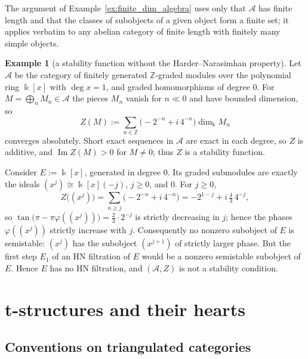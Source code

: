 \documentclass[12pt]{amsart}
\newenvironment{remark}{{\textbf{Remark.}}}
\numberwithin{theorem}{section}
\theoremstyle{definition}
\newtheorem{example}[theorem]{Example}
\newcommand{\ZZ}{\mathbb{Z}}
\newcommand{\calA}{\mathcal{A}}
\newcommand{\kk}{\Bbbk}
\newcommand{\im}{\operatorname{Im}}
\begin{document}
	\begin{remark}
		The argument of Example~\ref{ex:finite_dim_algebra} uses only that $\calA$ has finite length and that the classes of subobjects of a given object form a finite set; it applies verbatim to any abelian category of finite length with finitely many simple objects.
	\end{remark}
	
	\begin{example}[a stability function without the Harder--Narasimhan property]
		\label{ex:no_HN}
		Let $\calA$ be the category of finitely generated $\ZZ$-graded modules over the polynomial ring $\kk[x]$ with $\deg x = 1$, and graded homomorphisms of degree $0$. For $M = \bigoplus_n M_n \in \calA$ the pieces $M_n$ vanish for $n \ll 0$ and have bounded dimension, so
		\[
		Z(M) := \sum_{n \in \ZZ} \big( -2^{-n} + i \, 4^{-n} \big) \dim_\kk M_n
		\]
		converges absolutely. Short exact sequences in $\calA$ are exact in each degree, so $Z$ is additive, and $\im Z(M) > 0$ for $M \neq 0$; thus $Z$ is a stability function.
		
		Consider $E := \kk[x]$, generated in degree $0$. Its graded submodules are exactly the ideals $(x^j) \cong \kk[x](-j)$, $j \geqslant 0$, and $0$. For $j \geqslant 0$,
		\[
		Z\big( (x^j) \big) = \sum_{n \geqslant j} \big( -2^{-n} + i \, 4^{-n} \big) = -2^{1-j} + i \, \tfrac{4}{3} \, 4^{-j},
		\]
		so $\tan\big( \pi - \pi \varphi((x^j)) \big) = \tfrac{2}{3} \cdot 2^{-j}$ is strictly decreasing in $j$; hence the phases $\varphi((x^j))$ strictly increase with $j$. Consequently no nonzero subobject of $E$ is semistable: $(x^j)$ has the subobject $(x^{j+1})$ of strictly larger phase. But the first step $E_1$ of an HN filtration of $E$ would be a nonzero semistable subobject of $E$. Hence $E$ has no HN filtration, and $(\calA, Z)$ is not a stability condition.
	\end{example}
	
	\section{t-structures and their hearts}
	
	\subsection{Conventions on triangulated categories}
	
\end{document}
